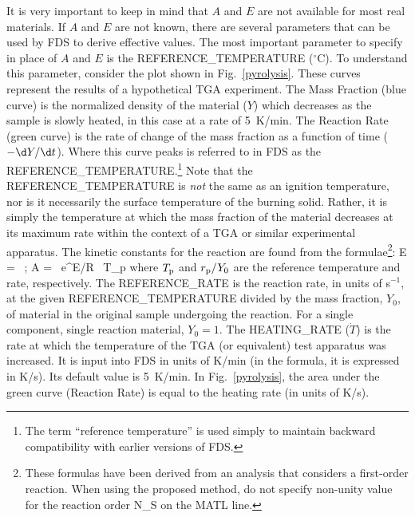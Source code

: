 \documentclass[11pt]{book}
\begin{document}
It is very important to keep in mind that $A$ and $E$ are not available for most real materials. If $A$ and $E$ are not known,
there are several parameters that can be used by FDS to derive effective values. The most important parameter to
specify in place of $A$ and $E$ is
the  {\ct REFERENCE\_TEMPERATURE} ($^\circ$C). To understand this parameter, consider the plot shown in Fig.~\ref{pyrolysis}.
These curves represent the results of a hypothetical TGA experiment.
The Mass Fraction (blue curve) is the normalized density of the material ($Y$) which decreases as the sample is slowly heated,
in this case at a rate
of 5~K/min. The Reaction Rate (green curve) is the rate of change of the mass fraction as a function of time ($-\d Y/\d t$).
Where this curve peaks is referred to in FDS
as the {\ct REFERENCE\_TEMPERATURE}.\footnote{The term ``reference temperature'' is used simply to maintain
backward compatibility with earlier versions of
FDS.}  Note that the {\ct REFERENCE\_TEMPERATURE} is {\em not} the same as an ignition temperature, nor is it necessarily
the surface temperature of the burning solid. Rather, it is simply the temperature at which the mass fraction of the material
decreases at its maximum rate within the context of a TGA or similar experimental apparatus. The
kinetic constants for the reaction are found from the formulae\footnote{These formulas have been derived from an analysis that considers a first-order reaction. When using the proposed method, do not specify non-unity value for the reaction order {\ct N\_S} on the {\ct MATL} line.}:
\be
   E =  \,  \quad ; \quad
   A =  \, {\rm e}^{E/R \, T_{\rm p}} \label{AandE}
\ee
where $T_{\rm p}$ and $r_{\rm p}/Y_0$ are the reference temperature and rate, respectively. The
{\ct REFERENCE\_RATE} is the reaction rate, in units of s$^{-1}$, at the given {\ct REFERENCE\_TEMPERATURE} divided by
the mass fraction, $Y_0$, of material in the original sample undergoing the reaction. For a single component, single
reaction material, $Y_0=1$. The {\ct HEATING\_RATE} ($\dot{T}$) is
the rate at which the temperature of the TGA (or equivalent) test
apparatus was increased. It is input into FDS in units of K/min (in the formula, it is expressed in K/s).
Its default value is 5~K/min. In Fig.~\ref{pyrolysis}, the area under the green curve
(Reaction Rate) is equal to the heating rate (in units of K/s).
\end{document}

